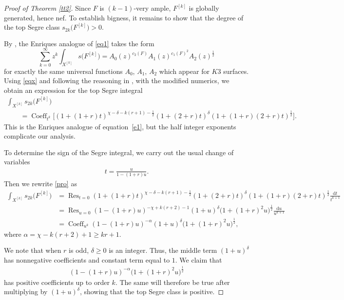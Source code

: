 \documentclass[pdftex]{sigma}
\numberwithin{equation}{section}
\begin{document}
\begin{proof}[Proof of Theorem \ref{tt2}] Since $F$ is $(k-1)$-very ample, $F^{[k]}$ is globally generated, hence nef. To establish bigness, it remains to show that the degree of the top Segre class $s_{2k}\big(F^{[k]}\big)>0$.

By \cite[Theorem 1]{MOP}, the Enriques analogue of \eqref{eq1} takes the form \begin{equation}\label{eqx}
\sum_{k=0}^{\infty} z^k \int_{X^{[k]}} s \big(F^{[k]}\big) = A_0(z)^{c_2(F)} A_1(z)^{c_1(F)^2} A_2(z)^{\frac{1}{2}}
\end{equation}
for exactly the same universal functions $A_0$, $A_1$, $A_2$ which appear for $K3$ surfaces. Using \eqref{eqx} and following the reasoning in \cite[p.~11]{MOP}, with the modified numerics, we obtain an expression for the top Segre integral
\begin{gather}\label{pro}
\int_{X^{[k]}} s_{2k}\big(F^{[k]}\big)\nonumber
\\ \qquad
{}=\operatorname{Coeff}_{t^k} \big[(1+(1+r)t)^{\chi-\delta-k(r+1) - \frac{1}{2}} (1+(2+r)t)^{\delta} (1+(1+r)(2+r)t)^{\frac{1}{2}}\big].
\end{gather}
This is the Enriques analogue of equation~\eqref{e1}, but the half integer exponents complicate our analysis.

To determine the sign of the Segre integral, we carry out the usual change of variables
\begin{gather*}
t=\frac{u}{1-(1+r)u}.
\end{gather*}
{\samepage Then we rewrite \eqref{pro} as
\begin{align*}
\int_{X^{[k]}} s_{2k}\big(F^{[k]}\big) &= \operatorname{Res}_{t=0} (1\!+(1\!+r)t)^{\chi-\delta-k(r+1) - \frac{1}{2}} (1\!+(2\!+r)t)^{\delta} (1\!+(1\!+r)(2\!+r)t)^{\frac{1}{2}}\frac{\mathrm dt}{t^{k+1}}
\\
&=\operatorname{Res}_{u=0} (1-(1+r)u)^{-\chi+k(r+2)-1}(1+u)^{\delta} \big(1+(1+r)^2u\big)^{\frac{1}{2}} \frac{\mathrm du}{u^{k+1}}
\\
&=\operatorname{Coeff}_{u^k} (1-(1+r)u)^{-\alpha} (1+u)^{\delta}\big(1+(1+r)^2u\big)^{\frac{1}{2}},
\end{align*}
where $\alpha=\chi-k(r+2)+1\geq kr+1$.}

We note that when $r$ is odd, $\delta\geq 0$ is an integer. Thus, the middle term $(1+u)^{\delta}$ has nonnegative coefficients and constant term equal to $1$. We claim that
\begin{gather*}
(1-(1+r)u)^{-\alpha}\big(1+(1+r)^2u\big)^{\frac{1}{2}}
\end{gather*}
has positive coefficients up to order $k$. The same will therefore be true after multiplying by $(1+u)^{\delta}$, showing that the top Segre class is positive.


\end{proof}
\end{document}
